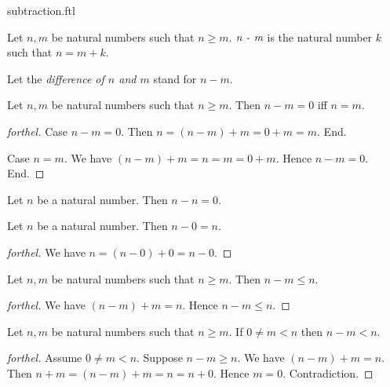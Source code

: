 \documentclass{naproche-library}
\begin{document}
\begin{smodule}[title=Subtraction]{subtraction.ftl}

\begin{definition}[forthel,id=ARITHMETIC_05_8878757276286976]
  Let $n, m$ be natural numbers such that $n \geq m$.
  $\emph{n - m}$ is the natural number $k$ such that $n = m + k$.

  Let the \emph{difference of $n$ and $m$} stand for $n - m$.
\end{definition}

\begin{proposition}[forthel,id=ARITHMETIC_05_874271710642176]
  Let $n, m$ be natural numbers such that $n \geq m$.
  Then $n - m = 0$ iff $n = m$.
\end{proposition}
\begin{proof}[forthel]
  Case $n - m = 0$.
    Then $n
      = (n - m) + m
      = 0 + m
      = m$.
  End.

  Case $n = m$.
    We have $(n - m) + m
      = n
      = m
      = 0 + m$.
    Hence $n - m = 0$.
  End.
\end{proof}

\begin{corollary}[forthel,id=ARITHMETIC_05_8457713057005568]
  Let $n$ be a natural number.
  Then $n - n = 0$.
\end{corollary}

\begin{proposition}[forthel,id=ARITHMETIC_05_8518521570983936]
  Let $n$ be a natural number.
  Then $n - 0 = n$.
\end{proposition}
\begin{proof}[forthel]
  We have $n
    = (n - 0) + 0
    = n - 0$.
\end{proof}

\begin{proposition}[forthel,id=ARITHMETIC_05_4222566117933056]
  Let $n, m$ be natural numbers such that $n \geq m$.
  Then $n - m \leq n$.
\end{proposition}
\begin{proof}[forthel]
  We have $(n - m) + m = n$.
  Hence $n - m \leq n$.
\end{proof}

\begin{proposition}[forthel,id=ARITHMETIC_05_1269537257291776]
  Let $n, m$ be natural numbers such that $n \geq m$.
  If $0 \neq m < n$ then $n - m < n$.
\end{proposition}
\begin{proof}[forthel]
  Assume $0 \neq m < n$.
  Suppose $n - m \geq n$.
  We have $(n - m) + m = n$.
  Then $n + m
    = (n - m) + m
    = n
    = n + 0$.
  Hence $m = 0$.
  Contradiction.
\end{proof}


\end{smodule}
\end{document}
